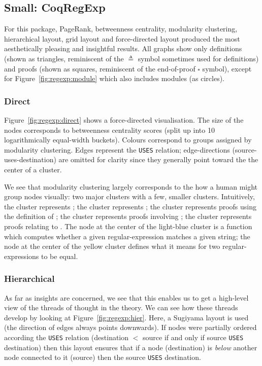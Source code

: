 \subsection{Small: CoqRegExp}

For this package, PageRank, betweenness centrality, modularity clustering,
hierarchical layout, grid layout and force-directed layout produced the most
aesthetically pleasing and insightful results. All graphs show only definitions
(shown as triangles, reminiscent of the $\triangleq$ symbol sometimes used for
definitions) and proofs (shown as squares, reminiscent of the end-of-proof
$\square$ symbol), except for Figure~\ref{fig:regexp:module} which also includes
modules (as circles).

\subsubsection{Direct}

Figure~\ref{fig:regexp:direct} shows a force-directed visualisation. The size of
the nodes corresponds to betweenness centrality scores (split up into 10
logarithmically equal-width buckets). Colours correspond to groups assigned by modularity
clustering. Edges represent the \texttt{USES} relation; edge-directions
(source-uses-destination) are omitted for clarity since they generally point
toward the the center of a cluster.

We see that modularity clustering largely corresponds to the how a human might
group nodes visually: two major clusters with a few, smaller clusters.
Intuitively, the  cluster represents ; the  cluster represents ; the  cluster represents proofs using the
definition of ; the  cluster
represents proofs involving ;
the  cluster represents proofs relating to . The node at the center of the light-blue cluster is a function which
computes whether a given regular-expression matches a given string; the node at
the center of the yellow cluster defines what it means for two
regular-expressions to be equal.

\subsubsection{Hierarchical}

As far as insights are concerned, we see that this enables us to get a
high-level view of the threads of thought in the theory. We can see how these
threads develop by looking at Figure~\ref{fig:regexp:hier}.  Here, a Sugiyama
layout is used (the direction of edges always points downwards). If nodes were
partially ordered according the \texttt{USES} relation (destination $<$ source
if and only if source \texttt{USES} destination) then this layout ensures that
if a node (destination) is \emph{below} another node connected to it (source)
then the source \texttt{USES} destination.

